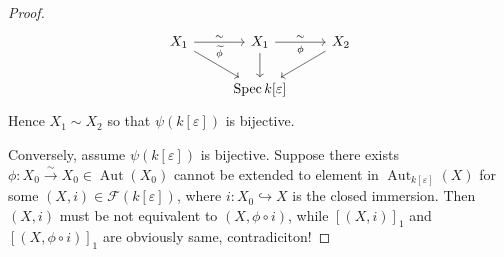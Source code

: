 \documentclass{ctexart}
\newcommand{\aut}{\operatorname{Aut}}
\newcommand{\spec}{\operatorname{Spec}}
\begin{document}
\begin{proof}
\begin{equation}
\begin{tikzcd}
            X_{1} \arrow[r, "\sim", "\widetilde{\phi}" swap] \arrow[dr] &
            X_{1} \arrow[r, "\sim", "\phi" swap] \arrow[d] &
            X_{2} \arrow[dl] \\
            & \spec k[\varepsilon] &
        \end{tikzcd}
    \end{equation}
    Hence $X_{1} \sim X_{2}$ so that $\psi(k[\varepsilon])$ is bijective.
    \par
    Conversely, assume $\psi(k[\varepsilon])$ is bijective.
    Suppose there exists $\phi: X_{0} \overset{\sim}{\rightarrow} X_{0}\in \aut(X_{0})$ cannot be extended to element in $\aut_{k[\varepsilon]}(X)$ for some $(X, i)\in \mathcal{F}(k[\varepsilon])$,
    where $i: X_{0} \hookrightarrow X$ is the closed immersion. 
    Then $(X, i)$ must be not equivalent to $(X, \phi \circ i)$, 
    while $[(X, i)]_{1}$ and $[(X, \phi \circ i)]_{1}$ are obviously same, contradiciton!
\end{proof}
\end{document}
